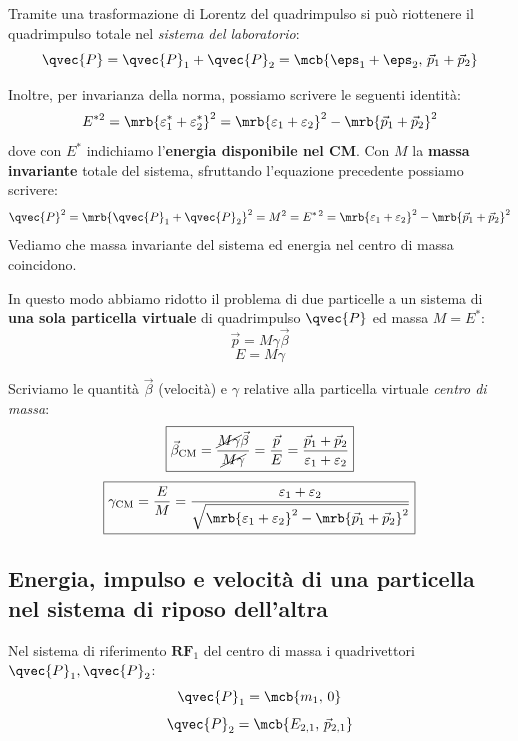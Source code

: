 Tramite una trasformazione di Lorentz del quadrimpulso si può riottenere
il quadrimpulso totale nel \textit{sistema del laboratorio}:
\begin{equation}
  \qvec{P}
  = \qvec{P}_1 + \qvec{P}_2
  = \mcb{\eps_1 + \eps_2,\, \vec{p}_1 + \vec{p}_2}
\end{equation}

Inoltre, per invarianza della norma, possiamo scrivere le seguenti
identità:
\begin{equation}
  E^{*2}
  = \mrb{\varepsilon_1^{\ast} + \varepsilon_2^{\ast}}^2
  = \mrb{\varepsilon_1 + \varepsilon_2}^2 - \mrb{\vec{p}_1 + \vec{p}_2}^2
\end{equation}
dove con $E ^{\ast}$ indichiamo l'\textbf{energia disponibile nel CM}.
Con $M$ la \textbf{massa invariante} totale del sistema, sfruttando
l'equazione precedente possiamo scrivere:
\begin{equation}
  \qvec{P}^2
  = \mrb{\qvec{P}_1 + \qvec{P}_2}^2
  = M^2
  = E^{\ast\,2}
  = \mrb{\varepsilon_1 + \varepsilon_2}^2 - \mrb{\vec{p}_1 + \vec{p}_2}^2
\end{equation}
Vediamo che massa invariante del sistema ed energia nel centro di massa
coincidono.

In questo modo abbiamo ridotto il problema di due particelle a un sistema di
\textbf{una sola particella virtuale } di quadrimpulso
$\qvec{P}$ ed massa $M = E^\ast$:
\begin{equation}
  \vec{p} = M\gamma\vec{\beta}
\end{equation}
\begin{equation}
  E = M\gamma
\end{equation}

Scriviamo le quantità $\vec{\beta}$ (velocità) e $\gamma$ relative alla particella
virtuale \textit{centro di massa}:
\begin{equation}
  \boxed{\vec{\beta}_{\text{CM}} 
  = \frac{\cancel{M \gamma} \vec{\beta}}{\cancel{M \gamma}} 
  = \frac{\vec{p}}{E}
  = \frac{\vec{p}_1 + \vec{p}_2}{\varepsilon_1 + \varepsilon_2}}
  \label{eq:beta_CM}
\end{equation}
\begin{equation}
  \boxed{\gamma_{\text{CM}}
  = \frac{E}{M}
  = \frac{\varepsilon_1 + \varepsilon_2}{\sqrt{\mrb{\varepsilon_1 +
  \varepsilon_2}^2 - \mrb{\vec{p}_1 + \vec{p}_2}^2}}}
  \label{eq:gamma_CM}
\end{equation}

\subsection{Energia, impulso e velocità di una particella nel sistema di riposo
dell'altra}
Nel sistema di riferimento $\textbf{RF}_1$ del centro di massa i quadrivettori
$\qvec{P}_1,\qvec{P}_2$:
\begin{equation}
  \qvec{P}_1 = \mcb{m_1,\, 0}
\end{equation}
\begin{equation}
  \qvec{P}_2 = \mcb{E_{2,1},\, \vec{p}_{2,1}}
\end{equation}

